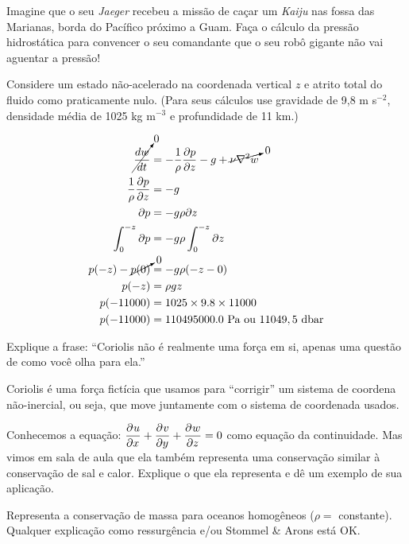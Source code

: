 \documentclass[letterpaper,portuguese,12pt,pdftex]{exam}
\begin{document}
\begin{questions}
  \question[5]
  Imagine que o seu {\it Jaeger} recebeu a missão de caçar um {\it Kaiju} nas
  fossa das Marianas, borda do Pacífico próximo a Guam.  Faça o cálculo da
  pressão hidrostática para convencer o seu comandante que o seu robô gigante
  não vai aguentar a pressão!

  Considere um estado não-acelerado na coordenada vertical $z$ e atrito
  total do fluido como praticamente nulo.  (Para seus cálculos use gravidade de
  9,8 m s$^{-2}$, densidade média de 1025 kg m$^{-3}$ e profundidade de 11 km.)

  \begin{solution}
    \begin{align*}
      \cancelto{0}{\dfrac{dw}{dt}} &= -\dfrac{1}{\rho}\dfrac{\partial p}{\partial z} - g + \cancelto{0}{\nu\nabla^2w}\\
      \dfrac{1}{\rho}\dfrac{\partial p}{\partial z} &=  -g \\
      \partial p &= -g\rho\partial z \\
      \int^{-z}_{0}\partial p &= -g\rho\int^{-z}_{0}\partial z \\
      p(-z) -\cancelto{0}{p(0)} &= -g\rho(-z-0) \\
      p(-z) &= \rho g z \\
      p(-11000) &= 1025 \times 9.8 \times 11000 \\
      p(-11000) &= 110495000.0 \text{ Pa ou } 11049,5 \text{ dbar}
    \end{align*}
  \end{solution}

  \question[5]
  Explique a frase: ``Coriolis não é realmente uma força em si, apenas uma
  questão de como você olha para ela.''

  \begin{solution}
    Coriolis é uma força fictícia que usamos para ``corrigir'' um sistema de
    coordena não-inercial, ou seja, que move juntamente com o sistema de
    coordenada usados.
  \end{solution}

  \question[2\half]
  Conhecemos a equação: \( \dpd{u}{x} + \dpd{v}{y} + \dpd{w}{z} = 0\) como
  equação da continuidade.  Mas vimos em sala de aula que ela também representa
  uma conservação similar à conservação de sal e calor.  Explique o que ela
  representa e dê um exemplo de sua aplicação.

  \begin{solution}
    Representa a conservação de massa para oceanos homogêneos ($\rho =$
    constante).  Qualquer explicação como ressurgência e/ou Stommel \& Arons
    está OK.
  \end{solution}



\end{questions}
\end{document}
